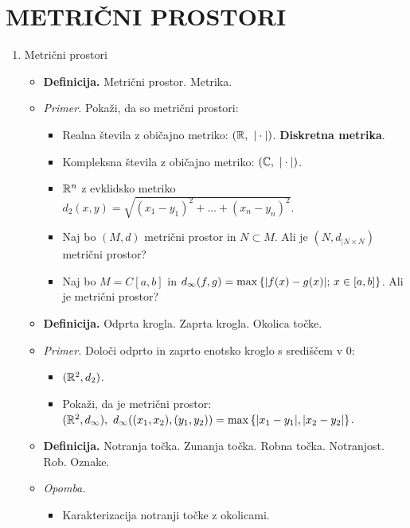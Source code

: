 \section{METRIČNI PROSTORI}

\begin{enumerate}
    \item Metrični prostori
    \begin{itemize}
        \item \colorbox{purple!30}{\textbf{Definicija.}} Metrični prostor. Metrika.
        \item \colorbox{yellow!30}{\emph{Primer.}} Pokaži, da so metrični prostori:
        \begin{itemize}
            \item Realna števila z običajno metriko: $(\mathbb{R}, \ |\cdot|)$. \textbf{Diskretna metrika}.
            \item Kompleksna števila z običajno metriko: $(\mathbb{C}, \ |\cdot|)$.
            \item $\mathbb{R}^n$ z evklidsko metriko $d_2(x,y) = \sqrt{(x_1 - y_1)^2 + \ldots + (x_n - y_n)^2}$.
            \item Naj bo $(M, d)$ metrični prostor in $N \subset M$. Ali je $(N, d_{|N \times N})$ metrični prostor?
            \item Naj bo $M = C[a,b]$ in $d_\infty(f,g) = \max \left\{|f(x) - g(x)|; \, x \in [a,b]\right\}$. Ali je metrični prostor?
        \end{itemize}
        \item \colorbox{purple!30}{\textbf{Definicija.}}  Odprta krogla. Zaprta krogla. Okolica točke.
        \item \colorbox{yellow!30}{\emph{Primer.}} Določi odprto in zaprto enotsko kroglo s središčem v $0$:
        \begin{itemize}
            \item $(\mathbb{R}^2, d_2)$.
            \item Pokaži, da je metrični prostor: $(\mathbb{R}^2, d_\infty), \ d_\infty ((x_1, x_2), (y_1, y_2)) = \max \left\{|x_1 - y_1|, |x_2 - y_2|\right\}$.
        \end{itemize}
        \item \colorbox{purple!30}{\textbf{Definicija.}} Notranja točka. Zunanja točka. Robna točka. Notranjost. Rob. Oznake.
        \item \colorbox{yellow!30}{\emph{Opomba.}} 
        \begin{itemize}
            \item Karakterizacija notranji točke z okolicami.
            

\end{itemize}
\end{itemize}
\end{enumerate}
